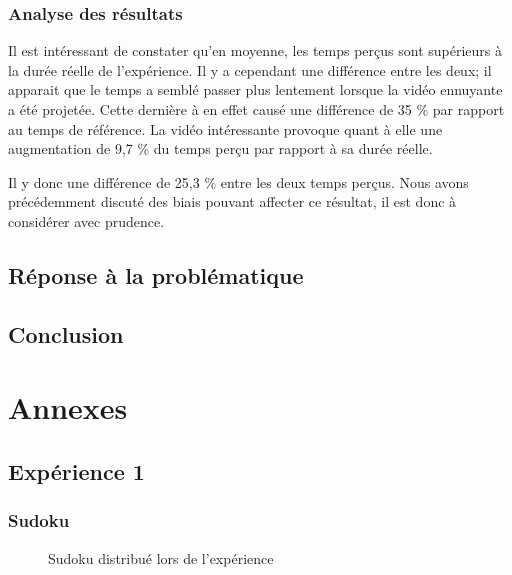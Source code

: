 \documentclass[12pt,fleqn,oneside,openany,]{book} %
\begin{document}
\subsection{Analyse des résultats} \label{ssec:analyseResult}
Il est intéressant de constater qu'en moyenne, les temps perçus sont supérieurs à la durée réelle de l'expérience. Il y a cependant une différence entre les deux; il apparait que le temps a semblé passer plus lentement lorsque la vidéo ennuyante a été projetée. Cette dernière à en effet causé une différence de 35 \% par rapport au temps de référence. La vidéo intéressante provoque quant à elle une augmentation de 9,7 \% du temps perçu par rapport à sa durée réelle.

Il y donc une différence de 25,3 \% entre les deux temps perçus. Nous avons précédemment discuté des biais pouvant affecter ce résultat, il est donc à considérer avec prudence. 

\newpage
\section{Réponse à la problématique} \label{sec:reponseProb}

\newpage
\section{Conclusion} \label{sec:conclusion}




\chapter{Annexes} \label{cha:annexes}
\section*{Expérience 1}

\subsection*{Sudoku} \label{sec:Sudoku}
\begin{figure}[htp]  %
	\caption{Sudoku distribué lors de l'expérience}
\end{figure}  
\end{document}
